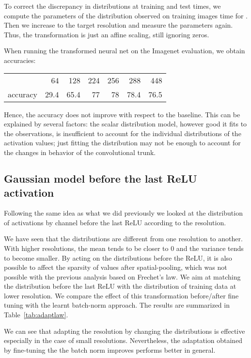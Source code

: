 To correct the discrepancy in distributions at training and test times, we compute the parameters  of the distribution observed on training images time for . 
Then we increase  to the target resolution and measure the parameters  again. 
Thus, the transformation is just an affine scaling, still ignoring zeros.

When running the transformed neural net on the Imagenet evaluation, we obtain accuracies: 
\begin{center}
\begin{tabular}{|l|rrrrrr|}
\hline 
 & 64 & 128 & 224 & 256 & 288 & 448 \\
    accuracy & 29.4 & 65.4 & 77 &78 & 78.4 & 76.5 \\
\hline
\end{tabular}
\end{center}
Hence, the accuracy does not improve with respect to the baseline. 
This can be explained by several factors: 
the scalar distribution model, however good it fits to the observations, is insufficient to account for the individual distributions of the activation values; 
just fitting the distribution may not be enough to account for the changes in behavior of the convolutional trunk.




\subsection{Gaussian model before the last ReLU activation}

Following the same idea as what we did previously we looked at the distribution of activations by channel  before the last ReLU according to the resolution.

We have seen that the distributions are different from one resolution to another. 
With higher resolutions,  the mean tends to be closer to 0 and the variance tends to become smaller.
By acting on the distributions before the ReLU, it is also possible to affect the sparsity of values after spatial-pooling, which was not possible with the previous analysis based on Frechet's law.
We aim at matching the distribution before the last ReLU with the distribution of training data at lower resolution. 
We compare the effect of this transformation before/after fine tuning with the learnt batch-norm approach. 
The results are summarized in Table~\ref{tab:adaptlaw}.

We can see that adapting the resolution by changing the distributions is effective especially in the case of small resolutions. 
Nevertheless, the adaptation obtained by fine-tuning the the batch norm improves performs better in general.

